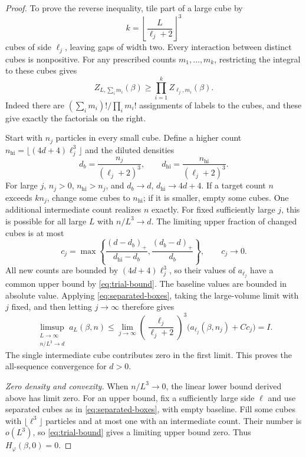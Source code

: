 \begin{proof}
To prove the reverse inequality, tile part of a large cube by
\[
 k=\left\lfloor\frac{L}{\ell_j+2}\right\rfloor^3
\]
cubes of side $\ell_j$, leaving gaps of width two. Every interaction
between distinct cubes is nonpositive. For any prescribed counts
$m_1,\ldots,m_k$, restricting the integral to these cubes gives
\begin{equation}
 Z_{L,\sum_i m_i}(\beta)
 \ge\prod_{i=1}^k Z_{\ell_j,m_i}(\beta).
 \label{eq:separated-boxes}
\end{equation}
Indeed there are $(\sum_i m_i)!/\prod_i m_i!$ assignments of labels
to the cubes, and these give exactly the factorials on the right.

Start with $n_j$ particles in every small cube. Define a higher count
$n_{\mathrm{hi}}=\lfloor(4d+4)\ell_j^3\rfloor$ and the diluted
densities
\[
 d_b=\frac{n_j}{(\ell_j+2)^3},\qquad
 d_{\mathrm{hi}}=\frac{n_{\mathrm{hi}}}{(\ell_j+2)^3}.
\]
For large $j$, $n_j>0$, $n_{\mathrm{hi}}>n_j$, and
$d_b\to d$, $d_{\mathrm{hi}}\to4d+4$. If a target count $n$
exceeds $kn_j$, change some cubes to $n_{\mathrm{hi}}$; if it is
smaller, empty some cubes. One additional intermediate count realizes
$n$ exactly. For fixed sufficiently large $j$, this is possible for
all large $L$ with $n/L^3\to d$. The limiting upper fraction of
changed cubes is at most
\[
 c_j=\max\left\{
 \frac{(d-d_b)_+}{d_{\mathrm{hi}}-d_b},
 \frac{(d_b-d)_+}{d_b}\right\},
 \qquad c_j\longrightarrow0.
\]
All new counts are bounded by $(4d+4)\ell_j^3$, so their values of
$a_{\ell_j}$ have a common upper bound by \eqref{eq:trial-bound}.
The baseline values are bounded in absolute value. Applying
\eqref{eq:separated-boxes}, taking the large-volume limit with $j$
fixed, and then letting $j\to\infty$ therefore gives
\[
 \limsup_{\substack{L\to\infty\\n/L^3\to d}}a_L(\beta,n)
 \le\lim_{j\to\infty}
 \left(\frac{\ell_j}{\ell_j+2}\right)^3
 \bigl(a_{\ell_j}(\beta,n_j)+C c_j\bigr)=I.
\]
The single intermediate cube contributes zero in the first limit.
This proves the all-sequence convergence for $d>0$.

\emph{Zero density and convexity.}
When $n/L^3\to0$, the linear lower bound derived above has limit
zero. For an upper bound, fix a sufficiently large side $\ell$ and
use separated cubes as in \eqref{eq:separated-boxes}, with empty
baseline. Fill some cubes with $\lfloor\ell^3\rfloor$ particles
and at most one with an intermediate count. Their number is
$o(L^3)$, so \eqref{eq:trial-bound} gives a limiting upper bound
zero. Thus $H_\varphi(\beta,0)=0$.


\end{proof}
